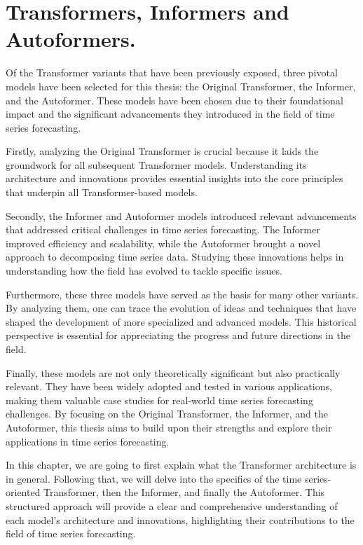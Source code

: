 \chapter{Transformers, Informers and Autoformers.}
\pagestyle{esitscCD}

Of the Transformer variants that have been previously exposed, three pivotal models have been selected for this thesis: the Original Transformer, the Informer, and the Autoformer. These models have been chosen due to their foundational impact and the significant advancements they introduced in the field of time series forecasting.

Firstly, analyzing the Original Transformer is crucial because it laids the groundwork for all subsequent Transformer models. Understanding its architecture and innovations provides essential insights into the core principles that underpin all Transformer-based models.

Secondly, the Informer and Autoformer models introduced relevant advancements that addressed critical challenges in time series forecasting. The Informer improved efficiency and scalability, while the Autoformer brought a novel approach to decomposing time series data. Studying these innovations helps in understanding how the field has evolved to tackle specific issues.

Furthermore, these three models have served as the basis for many other variants. By analyzing them, one can trace the evolution of ideas and techniques that have shaped the development of more specialized and advanced models. This historical perspective is essential for appreciating the progress and future directions in the field.

Finally, these models are not only theoretically significant but also practically relevant. They have been widely adopted and tested in various applications, making them valuable case studies for real-world time series forecasting challenges. By focusing on the Original Transformer, the Informer, and the Autoformer, this thesis aims to build upon their strengths and explore their applications in time series forecasting.

In this chapter, we are going to first explain what the Transformer architecture is in general. Following that, we will delve into the specifics of the time series-oriented Transformer, then the Informer, and finally the Autoformer. This structured approach will provide a clear and comprehensive understanding of each model's architecture and innovations, highlighting their contributions to the field of time series forecasting.


